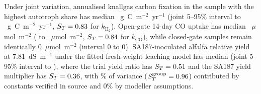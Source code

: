 \documentclass[11pt,a4paper]{article}
\begin{document}
Under joint variation, annualised knallgas carbon fixation in the sample with the highest autotroph share has median \QCarbonBoundMedian~g~C~m$^{-2}$~yr$^{-1}$ (joint 5--95\% interval \QCarbonBoundLow{} to \QCarbonBoundHigh~g~C~m$^{-2}$~yr$^{-1}$, $S_T=0.83$ for $k_{\mathrm{H_2}}$). Open-gate 14-day CO uptake has median \QMissingCOOpenMedian{}~$\mu$mol~m$^{-2}$ (\QMissingCOOpenLow{} to \QMissingCOOpenHigh{}~$\mu$mol~m$^{-2}$, $S_T=0.84$ for $k_{\mathrm{CO}}$), while closed-gate samples remain identically 0~$\mu$mol~m$^{-2}$ (interval 0 to 0). SA187-inoculated alfalfa relative yield at 7.81~dS~m$^{-1}$ under the fitted fresh-weight leaching model has median \QAlfalfaSaMedian{} (joint 5--95\% interval \QAlfalfaSaLow{} to \QAlfalfaSaHigh), where the trial yield ratio has $S_T=0.51$ and the SA187 yield multiplier has $S_T=0.36$, with \QAlfalfaVerifiedGroupSTPct\% of variance ($S_T^{\mathrm{group}}=0.96$) contributed by constants verified in source and 0\% by modeller assumptions.
\end{document}
